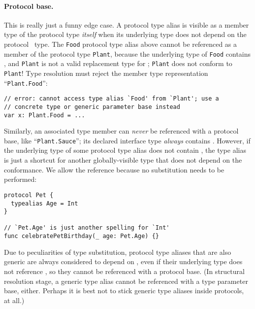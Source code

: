 \documentclass[../generics]{subfiles}
\begin{document}
\paragraph{Protocol base.} This is really just a funny edge case. A protocol type alias is visible as a member type of the protocol type \emph{itself} when its underlying type does not depend on the \IndexSelf protocol \tSelf\ type. The \texttt{Food} protocol type alias above cannot be referenced as a member of the protocol type \texttt{Plant}, because the underlying type of \texttt{Food} contains \tSelf, and \texttt{Plant} is not a valid replacement type for \tSelf; \texttt{Plant} does not conform to \texttt{Plant}! Type resolution must reject the member type representation ``\texttt{Plant.Food}'':
\begin{Verbatim}
// error: cannot access type alias `Food' from `Plant'; use a
// concrete type or generic parameter base instead
var x: Plant.Food = ...
\end{Verbatim}
Similarly, an associated type member can \emph{never} be referenced with a protocol base, like ``\texttt{Plant.Sauce}''; its declared interface type \emph{always} contains \tSelf. However, if the underlying type of some protocol type alias does not contain \tSelf, the type alias is just a shortcut for another globally-visible type that does not depend on the conformance. We allow the reference because no substitution needs to be performed:
\begin{Verbatim}
protocol Pet {
  typealias Age = Int
}

// `Pet.Age' is just another spelling for `Int'
func celebratePetBirthday(_ age: Pet.Age) {}
\end{Verbatim}

Due to peculiarities of type substitution, protocol type aliases that are also generic are always considered to depend on \tSelf, even if their underlying type does not reference \tSelf, so they cannot be referenced with a protocol base. (In structural resolution stage, a generic type alias cannot be referenced with a type parameter base, either. Perhaps it is best not to stick generic type aliases inside protocols, at all.)
\end{document}
